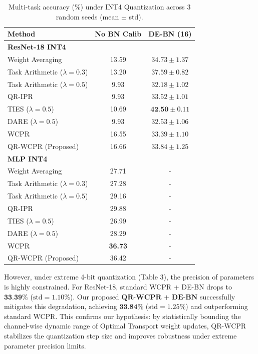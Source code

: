 \documentclass{article}
\theoremstyle{plain}
\theoremstyle{definition}
\theoremstyle{remark}
\begin{document}
\begin{table}[h]
\caption{Multi-task accuracy (\%) under INT4 Quantization across 3 random seeds (mean $\pm$ std).}
\label{tab:int4}
\begin{center}
\footnotesize
\setlength{\tabcolsep}{3pt}
\begin{tabular}{lcc}
\toprule
\textbf{Method} & \textbf{No BN Calib} & \textbf{DE-BN (16)} \\
\midrule
\textbf{ResNet-18 INT4} & & \\
Weight Averaging & 13.59 & $34.73 \pm 1.37$ \\
Task Arithmetic ($\lambda=0.3$) & 13.20 & $37.59 \pm 0.82$ \\
Task Arithmetic ($\lambda=0.5$) & 9.93 & $32.18 \pm 1.02$ \\
QR-IPR & 9.93 & $33.52 \pm 1.01$ \\
TIES ($\lambda=0.5$) & 10.69 & $\textbf{42.50} \pm 0.11$ \\
DARE ($\lambda=0.5$) & 9.93 & $32.53 \pm 1.06$ \\
WCPR & 16.55 & $33.39 \pm 1.10$ \\
QR-WCPR (Proposed) & 16.66 & $33.84 \pm 1.25$ \\
\midrule
\textbf{MLP INT4} & & \\
Weight Averaging & 27.71 & - \\
Task Arithmetic ($\lambda=0.3$) & 27.28 & - \\
Task Arithmetic ($\lambda=0.5$) & 29.16 & - \\
QR-IPR & 29.88 & - \\
TIES ($\lambda=0.5$) & 26.99 & - \\
DARE ($\lambda=0.5$) & 28.29 & - \\
WCPR & \textbf{36.73} & - \\
QR-WCPR (Proposed) & 36.42 & - \\
\bottomrule
\end{tabular}
\end{center}
\end{table}

However, under extreme 4-bit quantization (Table 3), the precision of parameters is highly constrained. For ResNet-18, standard WCPR + DE-BN drops to $\textbf{33.39}\%$ ($\text{std}=1.10\%$). Our proposed $\textbf{QR-WCPR + DE-BN}$ successfully mitigates this degradation, achieving $\textbf{33.84}\%$ ($\text{std}=1.25\%$) and outperforming standard WCPR. This confirms our hypothesis: by statistically bounding the channel-wise dynamic range of Optimal Transport weight updates, QR-WCPR stabilizes the quantization step size and improves robustness under extreme parameter precision limits.
\end{document}
